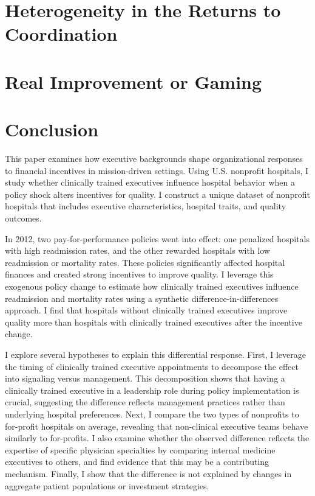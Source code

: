 \documentclass[12pt]{article}
\theoremstyle{definition}   %
\begin{document}
\section{Heterogeneity in the Returns to Coordination}

\section{Real Improvement or Gaming}




\section{Conclusion}

    This paper examines how executive backgrounds shape organizational responses to financial incentives in mission-driven settings. Using U.S. nonprofit hospitals, I study whether clinically trained executives influence hospital behavior when a policy shock alters incentives for quality. I construct a unique dataset of nonprofit hospitals that includes executive characteristics, hospital traits, and quality outcomes.

    In 2012, two pay-for-performance policies went into effect: one penalized hospitals with high readmission rates, and the other rewarded hospitals with low readmission or mortality rates. These policies significantly affected hospital finances and created strong incentives to improve quality. I leverage this exogenous policy change to estimate how clinically trained executives influence readmission and mortality rates using a synthetic difference-in-differences approach. I find that hospitals without clinically trained executives improve quality more than hospitals with clinically trained executives after the incentive change.
    
    I explore several hypotheses to explain this differential response. First, I leverage the timing of clinically trained executive appointments to decompose the effect into signaling versus management. This decomposition shows that having a clinically trained executive in a leadership role during policy implementation is crucial, suggesting the difference reflects management practices rather than underlying hospital preferences. Next, I compare the two types of nonprofits to for-profit hospitals on average, revealing that non-clinical executive teams behave similarly to for-profits. I also examine whether the observed difference reflects the expertise of specific physician specialties by comparing internal medicine executives to others, and find evidence that this may be a contributing mechanism. Finally, I show that the difference is not explained by changes in aggregate patient populations or investment strategies.
\end{document}

